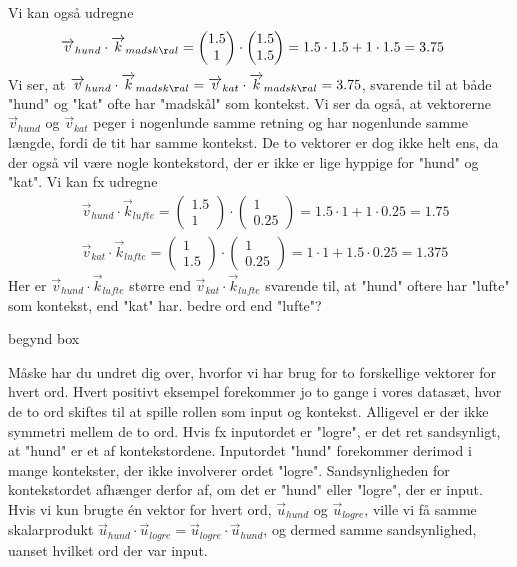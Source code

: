 \documentclass{article}
\newcommand{\am}[1]{{\color{red} #1}}
\begin{document}
Vi kan også udregne
\begin{align*}
&\overrightarrow{v}_{hund}\cdot \overrightarrow{k}_{madsk\aa l} = \begin{pmatrix} 1.5\\ 1\end{pmatrix}  \cdot  \begin{pmatrix} 1.5\\ 1.5\end{pmatrix} = 1.5\cdot 1.5 +  1\cdot 1.5 = 3.75 
\end{align*}
Vi ser, at $\overrightarrow{v}_{hund}\cdot \overrightarrow{k}_{madsk\aa l} =\overrightarrow{v}_{kat}\cdot \overrightarrow{k}_{madsk\aa l} =3.75$, svarende til at både "hund" og "kat" ofte har "madskål" som kontekst. Vi ser da også, at vektorerne $\overrightarrow{v}_{hund}$ og $\overrightarrow{v}_{kat} $ peger i nogenlunde samme retning og har nogenlunde samme længde, fordi de tit har samme kontekst. De to vektorer er dog ikke helt ens, da der også vil være nogle kontekstord, der er ikke er lige hyppige for "hund" og "kat". Vi kan fx udregne
\begin{align*}
&\overrightarrow{v}_{hund}\cdot \overrightarrow{k}_{lufte} = \begin{pmatrix} 1.5\\ 1\end{pmatrix}  \cdot  \begin{pmatrix} 1\\ 0.25\end{pmatrix} = 1.5\cdot 1 + 1\cdot 0.25 =1.75\\
&\overrightarrow{v}_{kat}\cdot \overrightarrow{k}_{lufte} =\begin{pmatrix} 1\\ 1.5\end{pmatrix}  \cdot  \begin{pmatrix} 1\\ 0.25\end{pmatrix} = 1\cdot 1 + 1.5\cdot 0.25 = 1.375 
\end{align*}
Her er $\overrightarrow{v}_{hund}\cdot \overrightarrow{k}_{lufte}$ større end $\overrightarrow{v}_{kat}\cdot \overrightarrow{k}_{lufte}$ svarende til, at "hund" oftere har "lufte" som kontekst, end "kat" har. \am{bedre ord end "lufte"?}

\am{begynd box}

Måske har du undret dig over, hvorfor vi har brug for to forskellige vektorer for hvert ord. Hvert positivt eksempel forekommer jo to gange i vores datasæt, hvor de to ord skiftes til at spille rollen som input og kontekst. Alligevel er der ikke symmetri mellem de to ord.  Hvis fx inputordet er "logre", er det ret sandsynligt, at "hund" er et af kontekstordene. Inputordet "hund" forekommer derimod i mange kontekster, der ikke involverer ordet "logre". Sandsynligheden for kontekstordet afhænger derfor af, om det er "hund" eller "logre", der er input. 
Hvis vi kun brugte én vektor for hvert ord, $\overrightarrow{u}_{hund}$ og $\overrightarrow{u}_{logre}$, ville vi få samme skalarprodukt $\overrightarrow{u}_{hund}\cdot \overrightarrow{u}_{logre} =  \overrightarrow{u}_{logre}\cdot \overrightarrow{u}_{hund}$, og dermed samme sandsynlighed, uanset hvilket ord der var input. 
\end{document}
